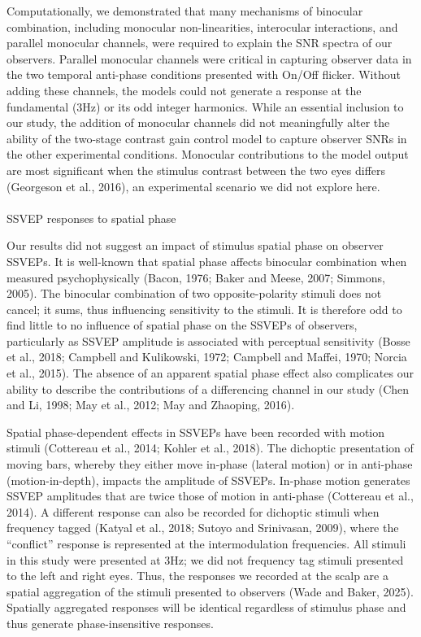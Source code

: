 \documentclass[
  12pt,
]{article}
\makeatletter
\let\oldparagraph\paragraph
\renewcommand{\paragraph}{
    \@ifstar
      \xxxParagraphStar
      \xxxParagraphNoStar
  }
\newcommand{\xxxParagraphStar}[1]{\oldparagraph*{#1}\mbox{}}
\newcommand{\xxxParagraphNoStar}[1]{\oldparagraph{#1}\mbox{}}
\makeatother
\begin{document}
Computationally, we demonstrated that many mechanisms of binocular
combination, including monocular non-linearities, interocular
interactions, and parallel monocular channels, were required to explain
the SNR spectra of our observers. Parallel monocular channels were
critical in capturing observer data in the two temporal anti-phase
conditions presented with On/Off flicker. Without adding these channels,
the models could not generate a response at the fundamental (3Hz) or its
odd integer harmonics. While an essential inclusion to our study, the
addition of monocular channels did not meaningfully alter the ability of
the two-stage contrast gain control model to capture observer SNRs in
the other experimental conditions. Monocular contributions to the model
output are most significant when the stimulus contrast between the two
eyes differs (Georgeson et al., 2016), an experimental scenario we did
not explore here.

\paragraph{SSVEP responses to spatial
phase}\label{ssvep-responses-to-spatial-phase}

Our results did not suggest an impact of stimulus spatial phase on
observer SSVEPs. It is well-known that spatial phase affects binocular
combination when measured psychophysically (Bacon, 1976; Baker and
Meese, 2007; Simmons, 2005). The binocular combination of two
opposite-polarity stimuli does not cancel; it sums, thus influencing
sensitivity to the stimuli. It is therefore odd to find little to no
influence of spatial phase on the SSVEPs of observers, particularly as
SSVEP amplitude is associated with perceptual sensitivity (Bosse et al.,
2018; Campbell and Kulikowski, 1972; Campbell and Maffei, 1970; Norcia
et al., 2015). The absence of an apparent spatial phase effect also
complicates our ability to describe the contributions of a differencing
channel in our study (Chen and Li, 1998; May et al., 2012; May and
Zhaoping, 2016).

Spatial phase-dependent effects in SSVEPs have been recorded with motion
stimuli (Cottereau et al., 2014; Kohler et al., 2018). The dichoptic
presentation of moving bars, whereby they either move in-phase (lateral
motion) or in anti-phase (motion-in-depth), impacts the amplitude of
SSVEPs. In-phase motion generates SSVEP amplitudes that are twice those
of motion in anti-phase (Cottereau et al., 2014). A different response
can also be recorded for dichoptic stimuli when frequency tagged (Katyal
et al., 2018; Sutoyo and Srinivasan, 2009), where the ``conflict''
response is represented at the intermodulation frequencies. All stimuli
in this study were presented at 3Hz; we did not frequency tag stimuli
presented to the left and right eyes. Thus, the responses we recorded at
the scalp are a spatial aggregation of the stimuli presented to
observers (Wade and Baker, 2025). Spatially aggregated responses will be
identical regardless of stimulus phase and thus generate
phase-insensitive responses.
\end{document}
